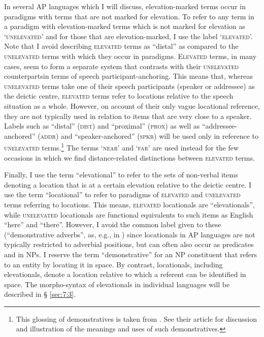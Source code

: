 In several AP languages which I will discuss, elevation-marked terms occur in paradigms with terms that are not marked for elevation. To refer to any term in a paradigm with elevation-marked terms which is not marked for elevation as `\textsc{unelevated}' and for those that are elevation-marked, I use the label `\textsc{elevated'.} Note that I avoid describing \textsc{elevated} terms as ``distal'' as compared to the \textsc{unelevated} terms with which they occur in paradigms. E\textsc{levated} terms, in many cases, seem to form a separate system that contrasts with their \textsc{unelevated} counterpartsin terms of speech participant-anchoring. This means that, whereas \textsc{unelevated} terms take one of their speech participants (speaker or addressee) as the deictic centre, \textsc{elevated} terms refer to locations relative to the speech situation as a whole. However, on account of their only vague locational reference, they are not typically used in relation to items that are very close to a speaker. Labels such as ``distal'' (\textsc{dist}) and ``proximal'' (\textsc{prox}) as well as ``addressee-anchored'' (\textsc{addr)} and ``speaker-anchored'' (\textsc{spkr)} will be used only in reference to \textsc{unelevated} terms.\footnote{{}  This glossing of demonstratives is taken from  \citet{SchapperEtAl2011}. See their article for discussion and illustration of the meanings and uses of such demonstratives.} The terms `\textsc{near}' and `\textsc{far'} are used instead for the few occasions in which we find distance-related distinctions between \textsc{elevated} terms.

Finally, I use the term ``elevational'' to refer to the sets of non-verbal items denoting a location that is at a certain elevation relative to the deictic centre. I use the term ``locational'' to refer to paradigms of \textsc{elevated} and \textsc{unelevated} terms referring to locations. This means, \textsc{elevated} locationals are ``elevationals'', while \textsc{unelevated} locationals are functional equivalents to such items as English ``here'' and ``there''. However, I avoid the common label given to these (``demonstrative adverbs'', as, e.g., in \citealt{Diessel1999}) since locationals in AP languages are not typically restricted to adverbial positions, but can often also occur as predicates and in NPs. I reserve the term ``demonstrative'' for an NP constituent that refers to an entity by locating it in space. By contrast, locationals, including elevationals, denote a location relative to which a referent can be identified in space. The morpho-syntax of elevationals in individual languages will be described in {\S} \ref{sec:7:3}.

